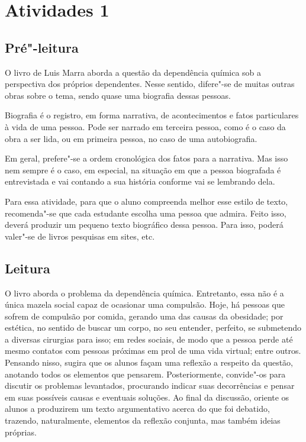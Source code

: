 \documentclass[11pt]{extarticle}
\begin{document}
\tableofcontents


\section{Atividades 1}


\subsection{Pré"-leitura}


O livro de Luis Marra aborda a questão da dependência
química sob a perspectiva dos próprios dependentes. Nesse sentido,
difere"-se de muitas outras obras sobre o tema, sendo quase uma biografia
dessas pessoas.

Biografia é o registro, em forma narrativa, de acontecimentos e fatos
particulares à vida de uma pessoa. Pode ser narrado em terceira pessoa,
como é o caso da obra a ser lida, ou em primeira pessoa, no caso de uma
autobiografia.

Em geral, prefere"-se a ordem cronológica dos fatos para a narrativa. Mas
isso nem sempre é o caso, em especial, na situação em que a pessoa
biografada é entrevistada e vai contando a sua história conforme vai se
lembrando dela.

Para essa atividade, para que o aluno compreenda melhor esse estilo de
texto, recomenda"-se que cada estudante escolha uma pessoa que admira.
Feito isso, deverá produzir um pequeno texto biográfico dessa pessoa.
Para isso, poderá valer"-se de livros pesquisas em sites, etc.


\subsection{Leitura}


O livro aborda o problema da dependência química.
Entretanto, essa não é a única mazela social capaz de ocasionar uma
compulsão. Hoje, há pessoas que sofrem de compulsão por comida, gerando
uma das causas da obesidade; por estética, no sentido de buscar um
corpo, no seu entender, perfeito, se submetendo a diversas cirurgias
para isso; em redes sociais, de modo que a pessoa perde até mesmo
contatos com pessoas próximas em prol de uma vida virtual; entre outros.
Pensando nisso, sugira que os alunos façam uma reflexão a respeito da
questão, anotando todos os elementos que pensarem. Posteriormente,
convide"-os para discutir os problemas levantados, procurando indicar
suas decorrências e pensar em suas possíveis causas e eventuais
soluções. Ao final da discussão, oriente os alunos a produzirem um texto
argumentativo acerca do que foi debatido, trazendo, naturalmente,
elementos da reflexão conjunta, mas também ideias próprias.
\end{document}
